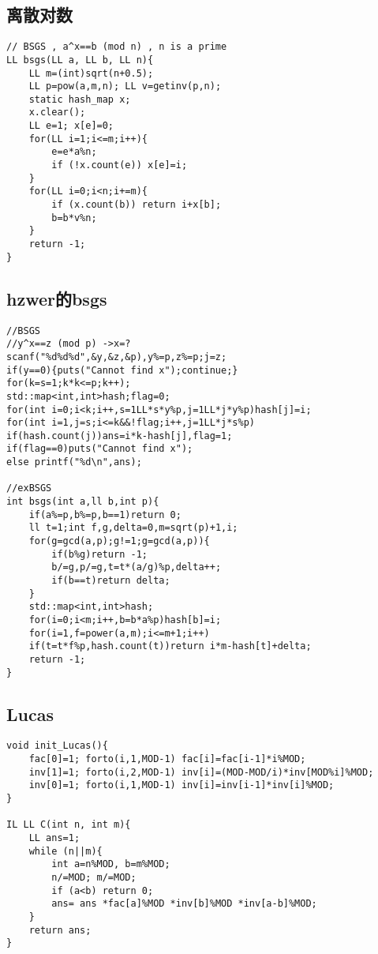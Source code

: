 \documentclass{article}
\begin{document}
\subsection{离散对数}
\begin{lstlisting}
// BSGS , a^x==b (mod n) , n is a prime
LL bsgs(LL a, LL b, LL n){
	LL m=(int)sqrt(n+0.5);
	LL p=pow(a,m,n); LL v=getinv(p,n);
	static hash_map x;
	x.clear();
	LL e=1; x[e]=0;
	for(LL i=1;i<=m;i++){
		e=e*a%n;
		if (!x.count(e)) x[e]=i;
	}
	for(LL i=0;i<n;i+=m){
		if (x.count(b)) return i+x[b];
		b=b*v%n;
	}
	return -1;
}
\end{lstlisting}

\subsection{hzwer的bsgs}
\begin{lstlisting}
//BSGS
//y^x==z (mod p) ->x=?
scanf("%d%d%d",&y,&z,&p),y%=p,z%=p;j=z;
if(y==0){puts("Cannot find x");continue;}
for(k=s=1;k*k<=p;k++);
std::map<int,int>hash;flag=0;
for(int i=0;i<k;i++,s=1LL*s*y%p,j=1LL*j*y%p)hash[j]=i;
for(int i=1,j=s;i<=k&&!flag;i++,j=1LL*j*s%p)
if(hash.count(j))ans=i*k-hash[j],flag=1;
if(flag==0)puts("Cannot find x");
else printf("%d\n",ans);

//exBSGS
int bsgs(int a,ll b,int p){
    if(a%=p,b%=p,b==1)return 0;
    ll t=1;int f,g,delta=0,m=sqrt(p)+1,i;
    for(g=gcd(a,p);g!=1;g=gcd(a,p)){
        if(b%g)return -1;
        b/=g,p/=g,t=t*(a/g)%p,delta++;
        if(b==t)return delta;
    }
    std::map<int,int>hash;
    for(i=0;i<m;i++,b=b*a%p)hash[b]=i;
    for(i=1,f=power(a,m);i<=m+1;i++)
    if(t=t*f%p,hash.count(t))return i*m-hash[t]+delta;
    return -1;
}
\end{lstlisting}

\subsection{Lucas}
\begin{lstlisting}
void init_Lucas(){
	fac[0]=1; forto(i,1,MOD-1) fac[i]=fac[i-1]*i%MOD;
	inv[1]=1; forto(i,2,MOD-1) inv[i]=(MOD-MOD/i)*inv[MOD%i]%MOD;
	inv[0]=1; forto(i,1,MOD-1) inv[i]=inv[i-1]*inv[i]%MOD;
}

IL LL C(int n, int m){
	LL ans=1;
	while (n||m){
		int a=n%MOD, b=m%MOD;
		n/=MOD; m/=MOD;
		if (a<b) return 0;
		ans= ans *fac[a]%MOD *inv[b]%MOD *inv[a-b]%MOD;
	}
	return ans;
}
\end{lstlisting}
\end{document}
